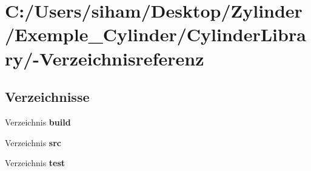 \section{C:/Users/siham/Desktop/Zylinder/Exemple\_\-Cylinder/Cylinder\-Library/-Verzeichnisreferenz}
\label{dir_C_3A_2FUsers_2Fsiham_2FDesktop_2FZylinder_2FExemple_5FCylinder_2FCylinderLibrary_2F}


\subsection*{Verzeichnisse}
\begin{CompactItemize}
\item 
Verzeichnis {\bf build}
\item 
Verzeichnis {\bf src}
\item 
Verzeichnis {\bf test}
\end{CompactItemize}

